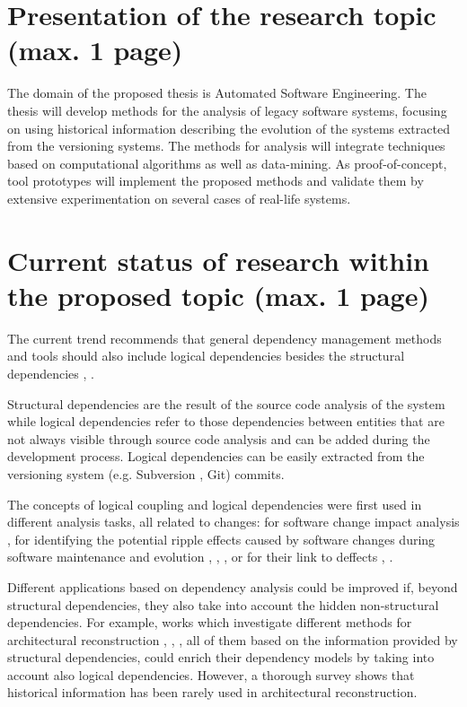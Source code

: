 \documentclass[12pt,a4paper,oneside]{report}
\begin{document}
{\let\clearpage\relax \chapter{Presentation of the research topic (max. 1 page)}}
The domain of the proposed thesis is Automated Software Engineering. The thesis will develop methods for the analysis of legacy software systems, focusing on using historical information describing the evolution of the systems extracted from the versioning systems. 
The methods for analysis will integrate techniques based on computational algorithms as well as data-mining. As proof-of-concept, tool prototypes will implement the proposed methods and validate them by extensive experimentation on several cases of real-life systems.

{\let\clearpage\relax \chapter{Current status of research within the proposed topic (max. 1 page)}}
The current trend recommends that general dependency management methods and tools should also include logical dependencies besides the structural dependencies \cite{Oliva:2011:ISL:2067853.2068086}, \cite{DBLP:journals/jss/AjienkaC17}. 

Structural dependencies are the result of the source code analysis of the system \cite{struct_dep} while logical dependencies refer to those dependencies between entities that are not always visible through source code analysis and can be added during the development process. Logical dependencies can be easily extracted from the versioning system (e.g. Subversion , Git) commits. 

The concepts of logical coupling and logical dependencies were first used in different analysis tasks, all related to changes: for software change impact analysis \cite{1553643}, for identifying the potential ripple effects caused by software changes during software maintenance and evolution \cite{DBLP:conf/issre/OlivaG15}, \cite{Oliva:2011:ISL:2067853.2068086}, \cite{Poshyvanyk2009}, \cite{posh2010} or for their link to deffects \cite{wiese}, \cite{Zimmermann:2004:MVH:998675.999460}.

Different applications based on dependency analysis could be improved if, beyond structural dependencies, they also take into account the hidden non-structural dependencies. For example, works  which investigate different methods for architectural reconstruction \cite{SoraConti}, \cite{SoraSem13}, \cite{PagerankENASE},  all of them based on the information provided by structural dependencies, could enrich their dependency models by taking into account also logical dependencies. However, a thorough survey \cite{sar} shows that historical information has been rarely used in architectural reconstruction. 
\end{document}
